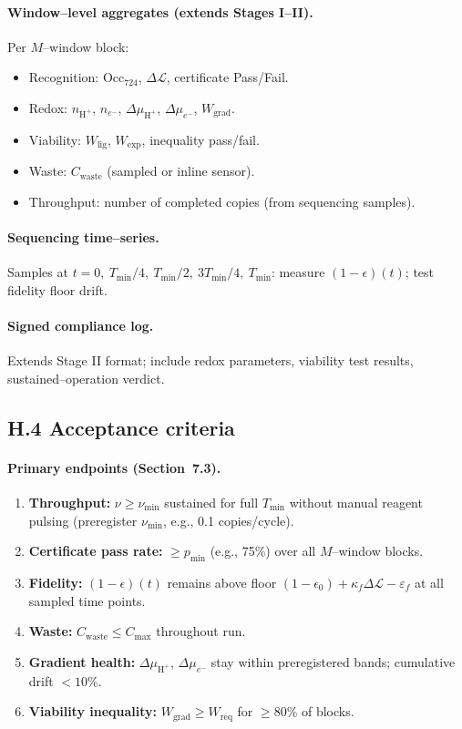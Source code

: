 \documentclass[11pt]{article}
\begin{document}
\paragraph{Window–level aggregates (extends Stages I–II).}
Per $M$–window block:
\begin{itemize}
\item Recognition: $\mathrm{Occ}_{724}$, $\Delta\mathcal{L}$, certificate \textsf{Pass/Fail}.
\item Redox: $n_{\mathrm{H}^+}$, $n_{e^-}$, $\Delta\mu_{\mathrm{H}^+}$, $\Delta\mu_{e^-}$, $W_{\mathrm{grad}}$.
\item Viability: $W_{\mathrm{lig}}$, $W_{\mathrm{exp}}$, inequality pass/fail.
\item Waste: $C_{\mathrm{waste}}$ (sampled or inline sensor).
\item Throughput: number of completed copies (from sequencing samples).
\end{itemize}

\paragraph{Sequencing time–series.}
Samples at $t=0,\ T_{\min}/4,\ T_{\min}/2,\ 3T_{\min}/4,\ T_{\min}$: measure $(1-\epsilon)(t)$; test fidelity floor drift.

\paragraph{Signed compliance log.}
Extends Stage II format; include redox parameters, viability test results, sustained–operation verdict.

\subsection*{H.4 Acceptance criteria}

\paragraph{Primary endpoints (Section~7.3).}
\begin{enumerate}
\item \textbf{Throughput:} $\nu\ge\nu_{\min}$ sustained for full $T_{\min}$ without manual reagent pulsing (preregister $\nu_{\min}$, e.g., 0.1 copies/cycle).
\item \textbf{Certificate pass rate:} $\ge p_{\min}$ (e.g., 75\%) over all $M$–window blocks.
\item \textbf{Fidelity:} $(1-\epsilon)(t)$ remains above floor $(1-\epsilon_0)+\kappa_f\Delta\mathcal{L}-\varepsilon_f$ at all sampled time points.
\item \textbf{Waste:} $C_{\mathrm{waste}}\le C_{\max}$ throughout run.
\item \textbf{Gradient health:} $\Delta\mu_{\mathrm{H}^+}$, $\Delta\mu_{e^-}$ stay within preregistered bands; cumulative drift $<10\%$.
\item \textbf{Viability inequality:} $W_{\mathrm{grad}}\ge W_{\mathrm{req}}$ for $\ge 80\%$ of blocks.
\end{enumerate}
\end{document}
